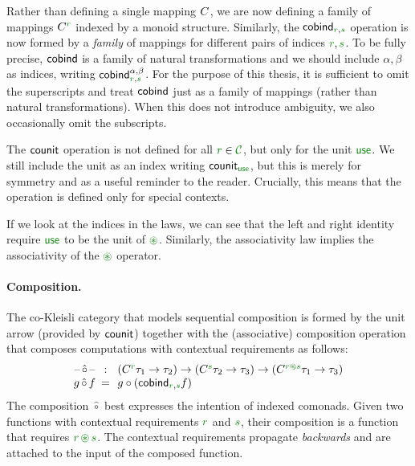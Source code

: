 \noindent
Rather than defining a single mapping $C^{}$, we are now defining a family of mappings 
$\ctyp{\cclrd{r}}{}$ indexed by a monoid structure. Similarly, the $\ident{cobind}_{\cclrd{r}, \cclrd{s}}$ 
operation is now formed by a \emph{family} of mappings for different pairs of indices 
$\cclrd{r}, \cclrd{s}$. To be fully precise, $\textnormal{\sffamily cobind}$ is a family of natural transformations 
and we should include $\alpha, \beta$ as indices, writing $\ident{cobind}_{\cclrd{r},\cclrd{s}}^{\alpha, \beta}$.
For the purpose of this thesis, it is sufficient to omit the superscripts and treat $\textnormal{\sffamily cobind}$ just 
as a family of mappings (rather than natural transformations). When this does not introduce ambiguity, 
we also occasionally omit the subscripts.

The $\textnormal{\sffamily counit}$ operation is not defined for all $\cclrd{r} \in \C$, but only for 
the unit $\cunit$. We still include the unit as an index writing $\ident{counit}_{\cunit}$, 
but this is merely for symmetry and as a useful reminder to the reader. Crucially, this means that 
the operation is defined only for special contexts.

If we look at the indices in the laws, we can see that the left and right identity 
require $\cunit$ to be the unit of $\cseq$. Similarly, the associativity law implies the 
associativity of the $\cseq$ operator. 

\paragraph{Composition.}
The co-Kleisli category that models sequential composition is formed by the unit arrow (provided
by $\textnormal{\sffamily counit}$) together with the (associative) composition operation that composes computations 
with contextual requirements as follows:
%
\begin{equation*}
\begin{array}{ccl}
\textnormal{--}\, \hat{\circ} \,\textnormal{--}&\narrow{:}& (\ctyp{\cclrd{r}}{\tau_1} \rightarrow \tau_2) 
  \rightarrow (\ctyp{\cclrd{s}}{\tau_2} \rightarrow \tau_3) 
  \rightarrow (\ctyp{\cclrd{r} \cseq \cclrd{s}}{\tau_1} \rightarrow \tau_3) \\
g \, \hat{\circ} \, f &\narrow{=}& g \circ (\ident{cobind}_{\cclrd{r}, \cclrd{s}} f)
\end{array}
\end{equation*}
%
The composition $\hat{\circ}$ best expresses the intention of indexed comonads. Given two functions
with contextual requirements $\cclrd{r}$ and $\cclrd{s}$, their composition is a function that 
requires $\cclrd{r}\,\cseq\,\cclrd{s}$. The contextual requirements propagate \emph{backwards} and
are attached to the input of the composed function.

